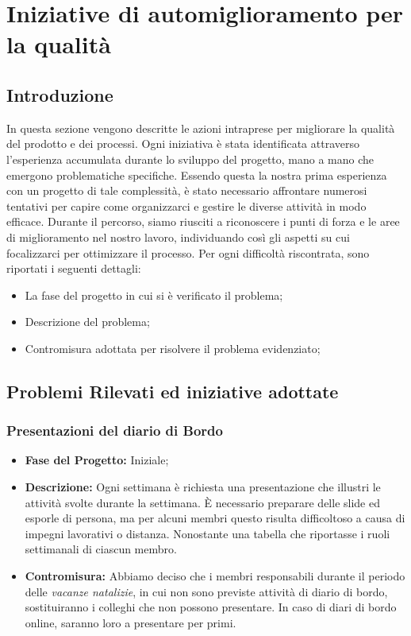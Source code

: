 \documentclass{article}
\begin{document}

\newpage
\section{Iniziative di automiglioramento per la qualità}
\subsection{Introduzione}
In questa sezione vengono descritte le azioni intraprese per migliorare la qualità del prodotto e dei processi. 
Ogni iniziativa è stata identificata attraverso l’esperienza accumulata durante lo sviluppo del progetto, mano a mano che emergono problematiche specifiche. 
Essendo questa la nostra prima esperienza con un progetto di tale complessità, è stato necessario affrontare numerosi tentativi per capire come organizzarci e gestire le diverse attività in modo efficace. 
Durante il percorso, siamo riusciti a riconoscere i punti di forza e le aree di miglioramento nel nostro lavoro, individuando così gli aspetti su cui focalizzarci per ottimizzare il processo. 
Per ogni difficoltà riscontrata, sono riportati i seguenti dettagli:
\begin{itemize}
    \item La fase del progetto in cui si è verificato il problema;
    \item Descrizione del problema;
    \item Contromisura adottata per risolvere il problema evidenziato;
\end{itemize}

\subsection{Problemi Rilevati ed iniziative adottate}
\subsubsection{Presentazioni del diario di Bordo}
\begin{itemize}
    \item \textbf{Fase del Progetto:} Iniziale;
    \item \textbf{Descrizione:} Ogni settimana è richiesta una presentazione che illustri le attività svolte durante la settimana. È necessario preparare delle slide ed esporle di persona, ma per alcuni membri questo risulta difficoltoso a causa di impegni lavorativi o distanza. Nonostante una tabella che riportasse i ruoli settimanali di ciascun membro.
    \item \textbf{Contromisura:} Abbiamo deciso che i membri responsabili durante il periodo delle \textit{vacanze natalizie}, in cui non sono previste attività di diario di bordo, sostituiranno i colleghi che non possono presentare. In caso di diari di bordo online, saranno loro a presentare per primi.
\end{itemize}
\end{document}
